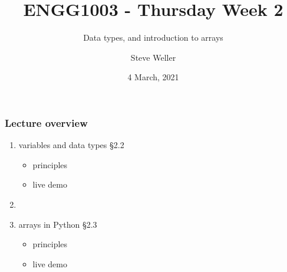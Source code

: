 \documentclass[14pt]{beamer}
\title{ENGG1003 - Thursday Week 2}
\subtitle{Data types, and introduction to arrays}
\author{Steve Weller}
\institute{University of Newcastle}
\date{4 March, 2021}
\newcommand\red[1]{{\color{red} #1}}
\begin{document}
\framebreak


\begin{frame}[fragile]

\frametitle{Lecture overview}
\begin{enumerate}
	\item variables and data types \red{\S2.2}
	\begin{itemize}
		\item principles
		\item live demo
	\end{itemize}

	\item[]
	
	\item arrays in Python \red{\S2.3}
		\begin{itemize}
			\item principles
			\item live demo
		\end{itemize}

\end{enumerate}

\end{frame}


\end{document}
